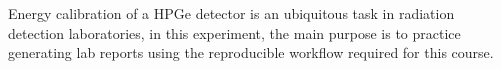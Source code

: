 Energy calibration of a HPGe detector is an ubiquitous task in radiation detection laboratories, in this experiment, the main purpose is to practice generating lab reports using the reproducible workflow required for this course.
